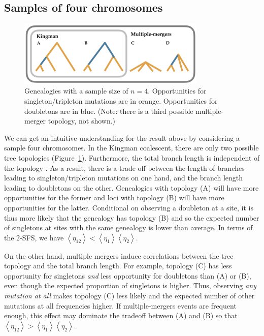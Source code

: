 \documentclass[11pt, letterpaper]{article}   	%
\newcommand{\Fig}[1]{Figure~\ref{#1}}
\newcommand{\E}[1]{\left< #1 \right>}
\begin{document}
\subsection*{Samples of four chromosomes}

\begin{figure}
\centering
\includegraphics[width=0.8\textwidth]{figures/trees.png}
\caption{Genealogies with a sample size of $n=4$. Opportunities for singleton/tripleton mutations are in orange. Opportunities for doubletons are in blue. (Note: there is a third possible multiple-merger topology, not shown.) \label{fig:trees}}
\end{figure}

We can get an intuitive understanding for the result above by considering a sample four chromosomes.
In the Kingman coalescent, there are only two possible tree topologies (\Fig{fig:trees}).
Furthermore, the total branch length is independent of the topology \cite{Wakeley2009}.
As a result, there is a trade-off between the length of branches leading to singleton/tripleton mutations on one hand, and the branch length leading to doubletons on the other.
Genealogies with topology (A) will have more opportunities for the former and loci with topology (B) will have more opportunities for the latter.
Conditional on observing a doubleton at a site, it is thus more likely that the genealogy has topology (B) and so the expected number of singletons at sites with the same genealogy is lower than average.
In terms of the 2-SFS, we have $\E{\eta_{12}} < \E{\eta_{1}} \E{\eta_{2}}$.

On the other hand, multiple mergers induce correlations between the tree topology and the total branch length.
For example, topology (C) has less opportunity for singletons \emph{and} less opportunity for doubletons than (A) or (B), even though the expected proportion of singletons is higher.
Thus, observing \emph{any mutation at all} makes topology (C) less likely and the expected number of other mutations at all frequencies higher.
If multiple-mergers events are frequent enough, this effect may dominate the tradeoff between (A) and (B) so that $\E{\eta_{12}} > \E{\eta_{1}} \E{\eta_{2}}$.
\end{document}
